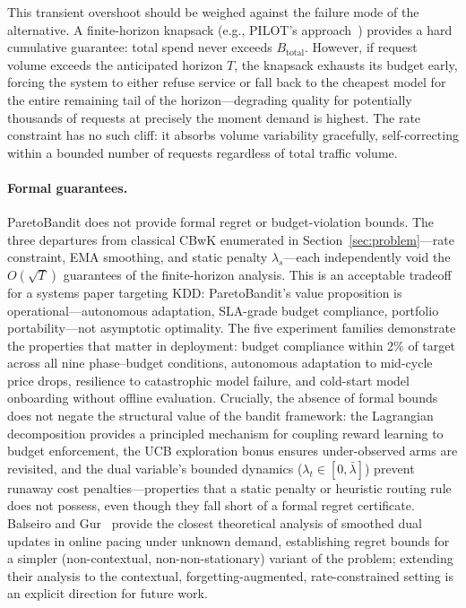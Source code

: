 This transient overshoot should be weighed against the failure mode of the alternative.
A finite-horizon knapsack (e.g., PILOT's approach~\cite{panda2025pilot}) provides a hard cumulative guarantee: total spend never exceeds $B_{\mathrm{total}}$.
However, if request volume exceeds the anticipated horizon $T$, the knapsack exhausts its budget early, forcing the system to either refuse service or fall back to the cheapest model for the entire remaining tail of the horizon---degrading quality for potentially thousands of requests at precisely the moment demand is highest.
The rate constraint has no such cliff: it absorbs volume variability gracefully, self-correcting within a bounded number of requests regardless of total traffic volume.

\paragraph{Formal guarantees.}
ParetoBandit does not provide formal regret or budget-violation bounds.
The three departures from classical CBwK enumerated in Section~\ref{sec:problem}---rate constraint, EMA smoothing, and static penalty $\lambda_s$---each independently void the $O(\sqrt{T})$ guarantees of the finite-horizon analysis.
This is an acceptable tradeoff for a systems paper targeting KDD: ParetoBandit's value proposition is operational---autonomous adaptation, SLA-grade budget compliance, portfolio portability---not asymptotic optimality.
The five experiment families demonstrate the properties that matter in deployment: budget compliance within 2\% of target across all nine phase--budget conditions, autonomous adaptation to mid-cycle price drops, resilience to catastrophic model failure, and cold-start model onboarding without offline evaluation.
Crucially, the absence of formal bounds does not negate the structural value of the bandit framework: the Lagrangian decomposition provides a principled mechanism for coupling reward learning to budget enforcement, the UCB exploration bonus ensures under-observed arms are revisited, and the dual variable's bounded dynamics ($\lambda_t \in [0, \bar\lambda]$) prevent runaway cost penalties---properties that a static penalty or heuristic routing rule does not possess, even though they fall short of a formal regret certificate.
Balseiro and Gur~\cite{balseiro2019learning} provide the closest theoretical analysis of smoothed dual updates in online pacing under unknown demand, establishing regret bounds for a simpler (non-contextual, non-non-stationary) variant of the problem; extending their analysis to the contextual, forgetting-augmented, rate-constrained setting is an explicit direction for future work.

